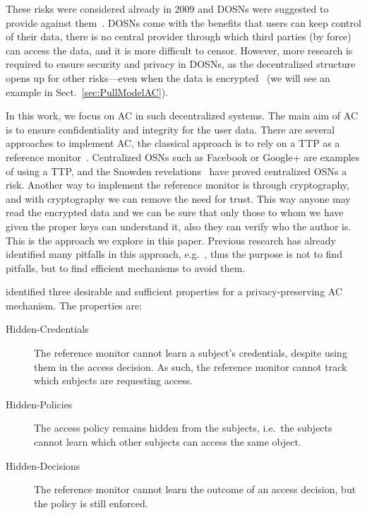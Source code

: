 These risks were considered already in 2009 and \acp{DOSN} were suggested to 
provide against them~\cite[e.g.][]{Peerson}.
\acp{DOSN} come with the benefits that users can keep control of their data, 
there is no central provider through which third parties (by force) can access 
the data, and it is more difficult to censor.
However, more research is required to ensure security and privacy in \acp{DOSN}, as 
the decentralized structure opens up for other risks---even when the data is 
encrypted~\cite{DevilInMetadata} (we will see an example in 
Sect.~\ref{sec:PullModelAC}).

In this work, we focus on \ac{AC} in such decentralized systems.
The main aim of \ac{AC} is to ensure confidentiality and integrity for the user 
data.
There are several approaches to implement \ac{AC}, the classical approach is to 
rely on a \ac{TTP} as a reference monitor~\cite{AccessControl}.
Centralized \acp{OSN} such as Facebook or Google+ are examples of using 
a \ac{TTP}, and the Snowden revelations~\cite{prism} have proved centralized \acp{OSN} a risk.
Another way to implement the reference monitor is through cryptography, and 
with cryptography we can remove the need for trust.
This way anyone may read the encrypted data and we can be sure that only those 
to whom we have given the proper keys can understand it, also they can verify who
the author is.
This is the approach we explore in this paper.
Previous research has already identified many pitfalls in this approach, 
e.g.~\cite{DevilInMetadata}, thus the purpose is not to find pitfalls, but to 
find efficient mechanisms to avoid them.

\citet{TowardsPPACwHPHCHD} identified three desirable and sufficient properties for a privacy-preserving \ac{AC} mechanism.
The properties are:
\begin{description}
  \item[Hidden-Credentials] The reference monitor cannot learn a subject's 
    credentials, despite using them in the access decision.
    As such, the reference monitor cannot track which subjects are requesting 
    access.
  \item[Hidden-Policies] The access policy remains hidden from the subjects, 
    i.e.\ the subjects cannot learn which other subjects can access the same 
    object.
  \item[Hidden-Decisions] The reference monitor cannot learn the outcome of an 
    access decision, but the policy is still enforced.
\end{description}

